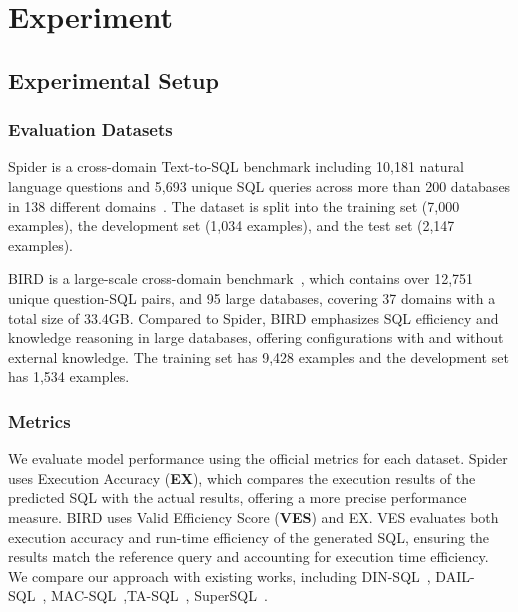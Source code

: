 \section{Experiment}

\subsection{Experimental Setup}

\subsubsection{Evaluation Datasets}

 Spider is a cross-domain Text-to-SQL benchmark including 10,181 natural language questions and 5,693 unique SQL queries across more than 200 databases in 138 different domains~\citep{yu2018spider}. The dataset is split into the training set (7,000 examples), the development set (1,034 examples), and the test set (2,147 examples).

 BIRD is a large-scale cross-domain benchmark~\citep{li2024can}, which contains over 12,751 unique question-SQL pairs, and 95 large databases, covering 37 domains with a total size of 33.4GB. 
Compared to Spider, BIRD emphasizes SQL efficiency and knowledge reasoning in large databases, offering configurations with and without external knowledge. 
The training set has 9,428 examples and the development set has 1,534 examples.

\subsubsection{Metrics}

We evaluate model performance using the official metrics for each dataset.
Spider uses Execution Accuracy (\textbf{EX}), which compares the execution results of the predicted SQL with the actual results, offering a more precise performance measure.
BIRD uses Valid Efficiency Score (\textbf{VES}) and EX. VES evaluates both execution accuracy and run-time efficiency of the generated SQL, ensuring the results match the reference query and accounting for execution time efficiency.
We compare our approach with existing works, including DIN-SQL~\citep{pourreza2024din}, DAIL-SQL~\citep{gao2024text}, MAC-SQL~\citep{wang2024mac},TA-SQL~\citep{qu2024before}, SuperSQL~\citep{li2024dawn}. 


